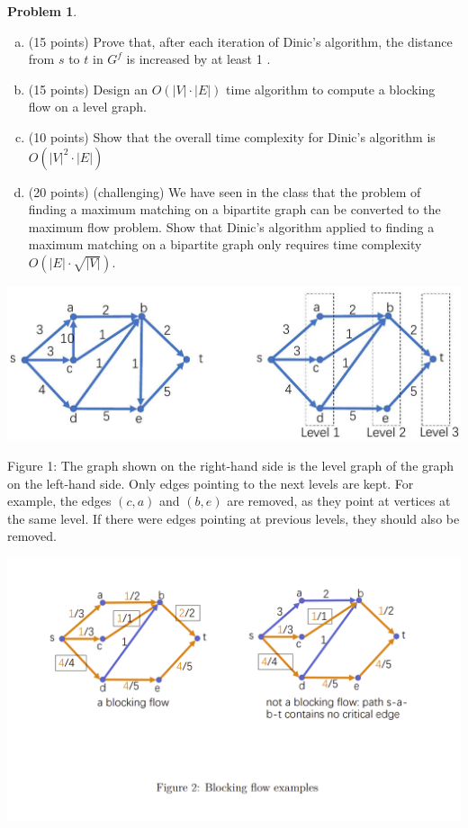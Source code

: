 \documentclass{article}
\theoremstyle{definition}
\newtheorem{prob}{Problem}
\begin{document}
\begin{prob}
		\begin{enumerate}[(a)]
			\item (15 points) Prove that, after each iteration of Dinic's algorithm, the distance from $s$ to $t$ in $G^{f}$ is increased by at least 1 .
			\item (15 points) Design an $O(|V| \cdot|E|)$ time algorithm to compute a blocking flow on a level graph.
			\item (10 points) Show that the overall time complexity for Dinic's algorithm is $O(|V|^{2}\cdot|E|)$
			\item (20 points) (challenging) We have seen in the class that the problem of finding a maximum matching on a bipartite graph can be converted to the maximum flow problem. Show that Dinic's algorithm applied to finding a maximum matching on a bipartite graph only requires time complexity $O(|E| \cdot \sqrt{|V|})$.
		\end{enumerate}

		\begin{center}
			\includegraphics[width=\textwidth,]{images/2022_12_05_f18b1b761080a7308df7g-6}
		\end{center}
	
		Figure 1: The graph shown on the right-hand side is the level graph of the graph on the left-hand side. Only edges pointing to the next levels are kept. For example, the edges $(c, a)$ and $(b, e)$ are removed, as they point at vertices at the same level. If there were edges pointing at previous levels, they should also be removed.

		\begin{center}
			\includegraphics[width=\textwidth]{images/6}
		\end{center}		

	
	\end{prob}	
	~
	
\end{document}
